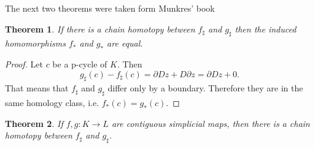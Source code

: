 \documentclass[toc=bib, headinclude]{scrartcl}
\theoremstyle{plain}
\newtheorem{theorem}{Theorem}[section]
\theoremstyle{definition}
\theoremstyle{remark}
\begin{document}
The next two theorems were taken form Munkres' book \parencite[Theorem 12.4/12.5, p. 66f]{mu}
\begin{theorem}\label{chain_hom->invariant}%
	If there is a chain homotopy between $f_\sharp$ and $g_\sharp$ then the induced homomorphisms $f_\ast$ and $g_\ast$ are equal.
\end{theorem}

\begin{proof}
	Let $c$ be a p-cycle of $K$. Then
	\[
	g_\sharp(c)-f_\sharp(c)=\partial Dz+D\partial z=\partial Dz+0.
	\]
	That means that $f_\sharp$ and $g_\sharp$ differ only by a boundary. Therefore they are in the same homology class, i.e. $f_\ast(c)=g_\ast(c)$.
\end{proof}


\begin{theorem}\label{contiguous->chain_hom}%
	If $f,g: K\to L$ are contiguous simplicial maps, then there is a chain homotopy between $f_\sharp$ and $g_\sharp$.
\end{theorem}%
\end{document}
